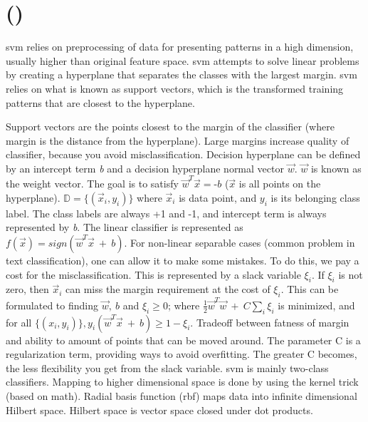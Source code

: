 \section[SVM]{ ()}
\label{sec:svm}


\gls{svm} relies on preprocessing of data for presenting patterns in a high dimension, usually higher than original feature space.
\gls{svm} attempts to solve linear problems by creating a hyperplane that separates the classes with the largest margin.
\gls{svm} relies on what is known as support vectors, which is the transformed training patterns that are closest to the hyperplane.
\cite{Duda2001}

Support vectors are the points closest to the margin of the classifier (where margin is the distance from the hyperplane).
Large margins increase quality of classifier, because you avoid misclassification.
Decision hyperplane can be defined by an intercept term \textit{b} and a decision hyperplane normal vector $\vec{w}$.
$\vec{w}$ is known as the weight vector.
The goal is to satisfy $\vec{w}^{T}\vec{x} = \textit{-b}$ ($\vec{x}$ is all points on the hyperplane).
$\mathbb{D} = \{(\vec{x}_{i}, y_{i})\}$ where $\vec{x}_{i}$ is data point, and $ y_{i}$ is its belonging class label.
The class labels are always +1 and -1, and intercept term is always represented by \textit{b}.
The linear classifier is represented as $f(\vec{x}) = sign(\vec{w}^{T}\vec{x}~+~b)$.
For non-linear separable cases (common problem in text classification), one can allow it to make some mistakes. 
To do this, we pay a cost for the misclassification.
This is represented by a slack variable $\xi_{i}$.
If $\xi_{i}$ is not zero, then  $\vec{x}_{i}$ can miss the margin requirement at the cost of $\xi_{i}$.
This can be formulated to finding  $\vec{w},~b$ and $\xi_{i} \geq 0$; where 
$\frac{1}{2}\vec{w}^{T}\vec{w}~+~C\sum_{i}\xi_{i}$ is minimized, 
and for all $\{(x_{i}, y_{i})\}, y_{i}(\vec{w}^{T}\vec{x}~+~b) \geq 1 - \xi_{i}$.
Tradeoff between fatness of margin and ability to amount of points that can be moved around.
The parameter C is a regularization term, providing ways to avoid overfitting.
The greater C becomes, the less flexibility you get from the slack variable.
\gls{svm} is mainly two-class classifiers.
Mapping to higher dimensional space is done by using the kernel trick (based on math).
Radial basis function (rbf) maps data into infinite dimensional Hilbert space.
Hilbert space is vector space closed under dot products.
\cite{Manning2008}

